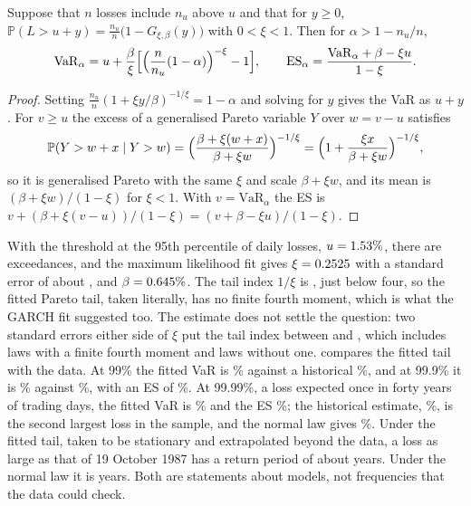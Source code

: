 \begin{chapterrefs}
\begin{proposition}\label{prop8:gpd}
Suppose that $n$ losses include $n_u$ above $u$ and that for $y\ge0$,
$\mathbb P(L>u+y)=\frac{n_u}{n}\bigl(1-G_{\xi,\beta}(y)\bigr)$ with $0<\xi<1$. Then for $\alpha>1-n_u/n$,
\[
  \mathrm{VaR}_\alpha=u+\frac{\beta}{\xi}\Bigl[\Bigl(\frac{n}{n_u}(1-\alpha)\Bigr)^{-\xi}-1\Bigr],\qquad
  \mathrm{ES}_\alpha=\frac{\mathrm{VaR}_\alpha+\beta-\xi u}{1-\xi}.
\]
\end{proposition}
\begin{proof}
Setting $\frac{n_u}{n}(1+\xi y/\beta)^{-1/\xi}=1-\alpha$ and solving for $y$ gives the VaR as $u+y$.
For $v\ge u$ the excess of a generalised Pareto variable $Y$ over $w=v-u$ satisfies
\[
  \mathbb P(Y>w+x\mid Y>w)=\Bigl(\frac{\beta+\xi(w+x)}{\beta+\xi w}\Bigr)^{-1/\xi}
  =\Bigl(1+\frac{\xi x}{\beta+\xi w}\Bigr)^{-1/\xi},
\]
so it is generalised Pareto with the same $\xi$ and scale $\beta+\xi w$, and its mean is
$(\beta+\xi w)/(1-\xi)$ for $\xi<1$. With $v=\mathrm{VaR}_\alpha$ the ES is
$v+(\beta+\xi(v-u))/(1-\xi)=(v+\beta-\xi u)/(1-\xi)$.
\end{proof}

With the threshold at the 95th percentile of daily losses, $u=1.53\%$, there are \evNu{} exceedances,
and the maximum likelihood fit gives $\xi=0.2525$ with a standard error of about \evXiSe, and
$\beta=0.645\%$. The tail index $1/\xi$ is \evAlphaTail, just below four, so the fitted Pareto tail, taken
literally, has no finite fourth moment, which is what the GARCH fit suggested too. The estimate does
not settle the question: two standard errors either side of $\xi$ put the tail index between
\evAlphaLo{} and \evAlphaHi, which includes laws with a finite fourth moment and laws without one.  compares the fitted
tail with the data. At 99\% the fitted VaR is \evVarN\% against a historical \evHsVarN\%, and at
99.9\% it is \evVarT\% against \evHsVarT\%, with an ES of \evEsT\%. At 99.99\%, a loss expected once in
forty years of trading days, the fitted VaR is \evVarF\% and the ES \evEsF\%; the historical estimate,
\evHsVarF\%, is the second largest loss in the sample, and the normal law gives \evNorVarF\%. Under the
fitted tail, taken to be stationary and extrapolated beyond the data, a loss as large as that of 19
October 1987 has a return period of about \evYears{} years. Under the normal law it is
\evNormalYears{} years. Both are statements about models, not frequencies that the data could check.


\end{chapterrefs}
